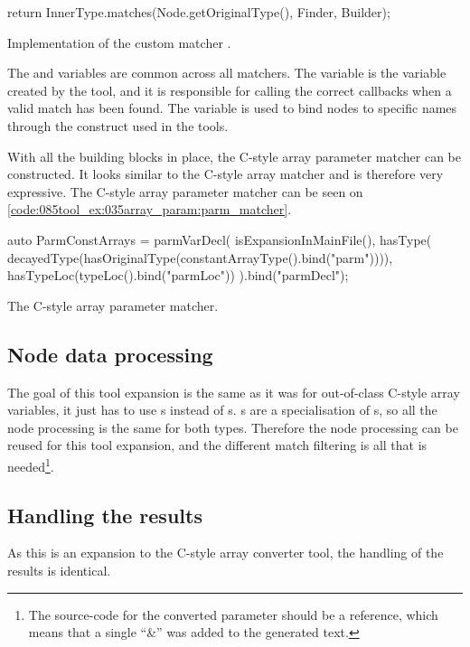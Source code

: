 \begin{listing}[H]
    \begin{cppcode}
return InnerType.matches(Node.getOriginalType(), Finder, Builder);
    \end{cppcode}
    \caption{Implementation of the custom matcher .}
    \label{code:085tool_ex:035array_param:match_impl}
\end{listing}

The  and  variables are common across all matchers. The  variable is the  variable created by the tool, and it is responsible for calling the correct callbacks when a valid match has been found. The  variable is used to bind nodes to specific names through the  construct used in the tools.

With all the building blocks in place, the C-style array parameter matcher can be constructed. It looks similar to the C-style array matcher and is therefore very expressive. The C-style array parameter matcher can be seen on \cref{code:085tool_ex:035array_param:parm_matcher}.

\begin{listing}[H]
    \begin{cppcode}
auto ParmConstArrays = parmVarDecl(
        isExpansionInMainFile(),
        hasType(
            decayedType(hasOriginalType(constantArrayType().bind("parm")))),
        hasTypeLoc(typeLoc().bind("parmLoc")) 
    ).bind("parmDecl");
    \end{cppcode}
    \caption{The C-style array parameter matcher.}
    \label{code:085tool_ex:035array_param:parm_matcher}
\end{listing}

\subsection{Node data processing}

The goal of this tool expansion is the same as it was for out-of-class C-style array variables, it just has to use s instead of s. s are a specialisation of s, so all the node processing is the same for both types. Therefore the node processing can be reused for this tool expansion, and the different match filtering is all that is needed\footnote{The source-code for the converted  parameter should be a reference, which means that a single ``\&'' was added to the generated text.}.

\subsection{Handling the results}

As this is an expansion to the C-style array converter tool, the handling of the results is identical.